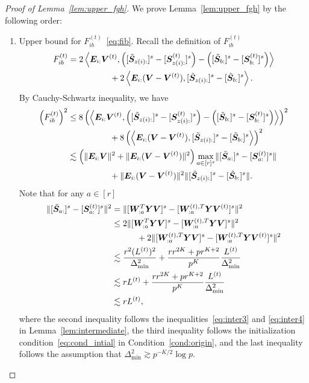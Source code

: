 \documentclass[lettersize,onecolumn,journal]{IEEEtran}
\theoremstyle{definition}
\theoremstyle{definition}
\newcommand{\of}[1]{\left(#1\right)}
\newcommand{\ang}[1]{\left\langle#1\right\rangle}
\begin{document}
\begin{proof}[Proof of Lemma~\ref{lem:upper_fgh}]
We prove Lemma~\ref{lem:upper_fgh} by the following order:
\begin{enumerate}
    \item Upper bound for $F_{ib}^{(t)}$~\eqref{eq:fib}. Recall the definition of $F_{ib}^{(t)}$ 
    \begin{align}
         F_{ib}^{(t)} &= 2 \ang{\mE_{i:} \mV^{(t)}, \of{ [ \tilde \mS_{z(i):} ]^s  - [\mS_{z(i):}^{(t)} ]^s  }  - \of{  [  \tilde \mS_{b:} ]^s  - [ \mS_{b:}^{(t)} ]^s  }  } \\
        & \quad \quad \quad \quad \quad + 2 \ang{ \mE_{i:}(\mV - \mV^{(t)} ), [ \tilde \mS_{z(i):} ]^s - [ \tilde \mS_{b:} ]^s  }.
    \end{align}
    By Cauchy-Schwartz inequality, we have 
    \begin{align}
        \of{F_{ib}^{(t)}}^2 & \leq 8 \of{\ang{\mE_{i:} \mV^{(t)}, \of{ [  \tilde \mS_{z(i):} ]^s  -  [  \mS_{z(i):}^{(t)} ]^s  }  - \of{  [  \tilde \mS_{b:} ]^s  -  [  \mS_{b:}^{(t)} ]^s  }  }  }^2 \\
         & \quad \quad \quad \quad \quad + 8\of{ \ang{ \mE_{i:} (\mV - \mV^{(t)} ), [  \tilde \mS_{z(i):} ]^s - [ \tilde  \mS_{b:} ]^s  }}^2 \\
         & \lesssim \of{ \onormSize{}{\mE_{i:} \mV}^2 + \onormSize{}{\mE_{i:} ( \mV - \mV^{(t)} )}^2 } \max_{a \in [r]^s} \onormSize{}{  [  \tilde \mS_{a:} ]^s - [   \mS_{a:}^{(t)} ]^s  } \\
          & \quad \quad \quad \quad \quad +\onormSize{}{\mE_{i:} ( \mV - \mV^{(t)} )}^2  \onormSize{}{  [  \tilde \mS_{z(i):} ]^s - [  \tilde \mS_{b:} ]^s  }.
    \end{align}
    Note that for any $a \in [r]$ 
    \begin{align}
        \lVert  [  \tilde {\bm S}_{a:} ]^s - [   \bm S_{a:}^{(t)} ]^s  \rVert^2 &= \lVert [ \bm{W}_{:a}^T \bm Y \bm{V} ]^s - [ \bm{W}_{:a}^{(t),T} \bm Y \bm{V}^{(t)} ]^s \rVert^2 \\
        &\leq 2 \lVert [ \bm{W}_{:a}^T \bm Y \bm{V} ]^s  - [ \bm{W}_{:a}^{(t),T} \bm Y \bm{V} ]^s  \rVert^2  \\
        & \quad \quad \quad +2 \lVert[ \bm{W}_{:a}^{(t),T} \bm Y \bm{V} ]^s - [ \bm{W}_{:a}^{(t),T} \bm Y \bm{V}^{(t)} ]^s \rVert^2\\
        & \lesssim \frac{ r^2 (L^{(t)})^2}{ \Delta_{\min}^2} + \frac{ r r^{2K} + p r^{K+2}}{p^K} \frac{L^{(t)}}{\Delta_{\min}^2}\\
        & \lesssim r L^{(t)}+  \frac{ r r^{2K} + p r^{K+2}}{p^K} \frac{L^{(t)}}{\Delta_{\min}^2}\\
        & \lesssim r L^{(t)},
    \end{align}
    where the second inequality follows the inequalities~\eqref{eq:inter3} and \eqref{eq:inter4} in Lemma~\ref{lem:intermediate}, the third inequality follows the initialization condition~\eqref{eq:cond_intial} in Condition~\ref{cond:origin}, and the last inequality follows the assumption that $\Delta_{\min}^2 \gtrsim p^{-K/2}\log p$. 
    

\end{enumerate}
\end{proof}
\end{document}
